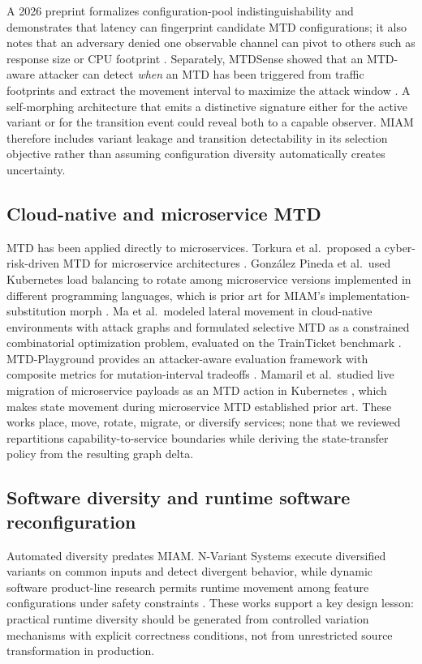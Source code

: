 \documentclass[11pt,letterpaper]{article}
\begin{document}
A 2026 preprint formalizes configuration-pool indistinguishability and demonstrates that latency can fingerprint candidate MTD configurations; it also notes that an adversary denied one observable channel can pivot to others such as response size or CPU footprint \cite{sengupta2026}. Separately, MTDSense showed that an MTD-aware attacker can detect \emph{when} an MTD has been triggered from traffic footprints and extract the movement interval to maximize the attack window \cite{moghaddam2024}. A self-morphing architecture that emits a distinctive signature either for the active variant or for the transition event could reveal both to a capable observer. MIAM therefore includes variant leakage and transition detectability in its selection objective rather than assuming configuration diversity automatically creates uncertainty.

\subsection{Cloud-native and microservice MTD}

MTD has been applied directly to microservices. Torkura et al.\ proposed a cyber-risk-driven MTD for microservice architectures \cite{torkura2018}. Gonz\'alez Pineda et al.\ used Kubernetes load balancing to rotate among microservice versions implemented in different programming languages, which is prior art for MIAM's implementation-substitution morph \cite{gonzalez2023}. Ma et al.\ modeled lateral movement in cloud-native environments with attack graphs and formulated selective MTD as a constrained combinatorial optimization problem, evaluated on the TrainTicket benchmark \cite{ma2026}. MTD-Playground provides an attacker-aware evaluation framework with composite metrics for mutation-interval tradeoffs \cite{farhad2026}. Mamaril et al.\ studied live migration of microservice payloads as an MTD action in Kubernetes \cite{mamaril2024}, which makes state movement during microservice MTD established prior art. These works place, move, rotate, migrate, or diversify services; none that we reviewed repartitions capability-to-service boundaries while deriving the state-transfer policy from the resulting graph delta.

\subsection{Software diversity and runtime software reconfiguration}

Automated diversity predates MIAM. N-Variant Systems execute diversified variants on common inputs and detect divergent behavior, while dynamic software product-line research permits runtime movement among feature configurations under safety constraints \cite{cox2006,damiani2012}. These works support a key design lesson: practical runtime diversity should be generated from controlled variation mechanisms with explicit correctness conditions, not from unrestricted source transformation in production.
\end{document}

